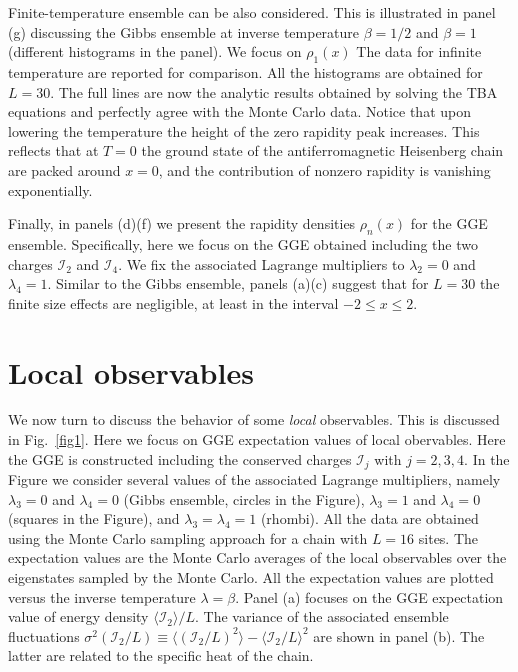 \documentclass[twocolumn,superscriptaddress,prb,10pt]{revtex4-1}
\begin{document}
Finite-temperature ensemble can be also considered. This is illustrated in panel (g) 
discussing the Gibbs ensemble at inverse temperature $\beta=1/2$ and $\beta=1$ (different 
histograms in the panel). We focus on $\rho_1(x)$ The data for infinite temperature are 
reported for comparison. All the histograms are obtained for $L=30$. The full lines are now 
the analytic results obtained by solving the TBA equations and perfectly agree with the 
Monte Carlo data. Notice that upon lowering the temperature the height of the zero rapidity 
peak increases. This reflects that at $T=0$ the ground state of the antiferromagnetic 
Heisenberg chain are packed around $x=0$, and the contribution of nonzero rapidity is 
vanishing exponentially. 

Finally, in panels (d)(f) we present the rapidity densities $\rho_n(x)$ for the GGE ensemble. 
Specifically, here we focus on the GGE obtained including the two charges ${\mathcal I}_2$ and 
${\mathcal I}_4$. We fix the associated Lagrange multipliers to $\lambda_2=0$ and $\lambda_4=1$. 
Similar to the Gibbs ensemble, panels (a)(c) suggest that for $L=30$ the finite size effects 
are negligible, at least in the interval $-2\le x\le 2$. 



\section{Local observables} 

We now turn to discuss the behavior of some {\it local} observables. This is discussed 
in Fig.~\ref{fig1}. Here we focus on GGE expectation values of local obervables. 
Here the GGE is constructed including the conserved charges ${\mathcal I}_j$ with $j=2,3,4$. 
In the Figure we consider several values of the associated Lagrange multipliers, namely 
$\lambda_3=0$ and $\lambda_4=0$ (Gibbs ensemble, circles in the Figure), $\lambda_3=1$ and 
$\lambda_4=0$ (squares in the Figure), and $\lambda_3=\lambda_4=1$ (rhombi). All the data 
are obtained using the Monte Carlo sampling approach for a chain with $L=16$ sites. The 
expectation values are the Monte Carlo averages of the local observables over the eigenstates 
sampled by the Monte Carlo. All the expectation values are plotted versus the inverse temperature $\lambda=\beta$. 
Panel (a) focuses on the GGE expectation value of energy density $\langle{\mathcal I}_2\rangle/L$. 
The variance of the associated ensemble fluctuations $\sigma^2({\mathcal I}_2/L)\equiv 
\langle ({\mathcal I}_2/L)^2\rangle-\langle{\mathcal I}_2/L\rangle^2$ are shown in 
panel (b). The latter are related to the specific heat of the chain. 
\end{document}
